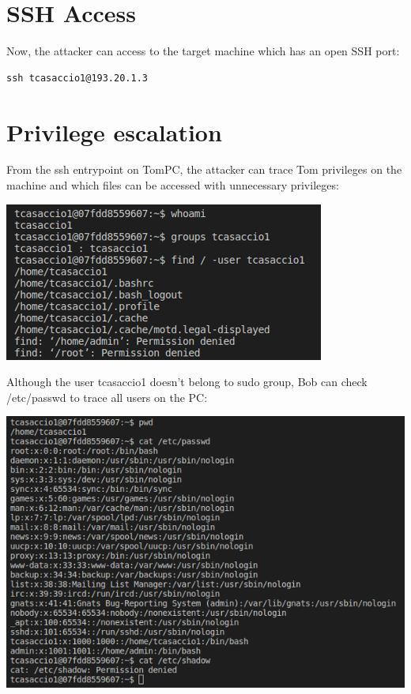 \documentclass[a4paper, 12pt, oneside]{extbook}
\begin{document}
\section{SSH Access}
Now, the attacker can access to the target machine which has an open SSH port:
\begin{lstlisting}[style=DOS]
  ssh tcasaccio1@193.20.1.3
\end{lstlisting}

\section{Privilege escalation}
From the ssh entrypoint on TomPC, the attacker can trace Tom privileges on the machine 
and which files can be accessed with unnecessary privileges:
\begin{center}
  \includegraphics[scale=1]{../Image/privilege_escalation_whoami.PNG}
\end{center}
Although the user tcasaccio1 doesn't belong to sudo group, Bob can check  
/etc/passwd to trace all users on the PC: 
\begin{center}
  \includegraphics[scale=0.8]{../Image/privilege_escalation_passwd.PNG}
\end{center}
\end{document}
